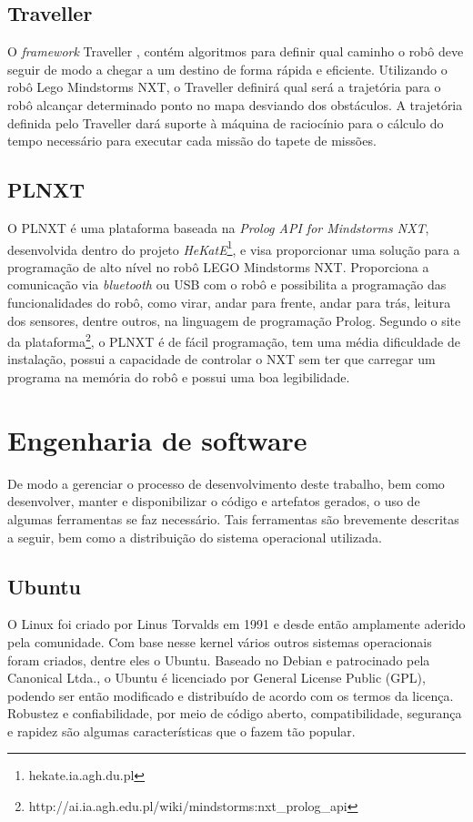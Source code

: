\subsection{Traveller}
O \textit{framework} Traveller \cite{rinconframework}, contém algoritmos para definir qual caminho o robô deve seguir de modo a chegar a um destino de forma rápida e eficiente. Utilizando o robô Lego Mindstorms NXT, o Traveller definirá qual será a trajetória para o robô alcançar determinado ponto no mapa desviando dos obstáculos. A trajetória definida pelo Traveller dará suporte à máquina de raciocínio para o cálculo do tempo necessário para executar cada missão do tapete de missões.

\subsection{PLNXT}
O PLNXT é uma plataforma baseada na \textit{Prolog API for Mindstorms NXT}, desenvolvida dentro do projeto \textit{HeKatE}\footnote{hekate.ia.agh.du.pl}, e visa proporcionar uma solução para a programação de alto nível no robô LEGO Mindstorms NXT.
Proporciona a comunicação via \textit{bluetooth} ou USB com o robô e possibilita a programação das funcionalidades do robô, como virar, andar para frente, andar para trás, leitura dos sensores, dentre outros, na linguagem de programação Prolog.
Segundo o site da plataforma\footnote{http://ai.ia.agh.edu.pl/wiki/mindstorms:nxt\_prolog\_api}, o PLNXT é de fácil programação, tem uma média dificuldade de instalação, possui a capacidade de controlar o NXT sem ter que carregar um programa na memória do robô e possui uma boa legibilidade.

\section{Engenharia de software}
De modo a gerenciar o processo de desenvolvimento deste trabalho, bem como desenvolver, manter e disponibilizar o código e artefatos gerados, o uso de algumas ferramentas se faz necessário. Tais ferramentas são brevemente descritas a seguir, bem como a distribuição do sistema operacional utilizada.

\subsection{Ubuntu}
O Linux foi criado por Linus Torvalds em 1991 \cite{torvalds2001just} e desde então amplamente aderido pela comunidade. Com base nesse kernel vários outros sistemas operacionais foram criados, dentre eles o Ubuntu. 
Baseado no Debian e patrocinado pela Canonical Ltda., o Ubuntu é licenciado por General License Public (GPL), podendo ser então modificado e distribuído de acordo com os termos da licença. Robustez e confiabilidade, por meio de código aberto, compatibilidade, segurança e rapidez são algumas características que o fazem tão popular. 

